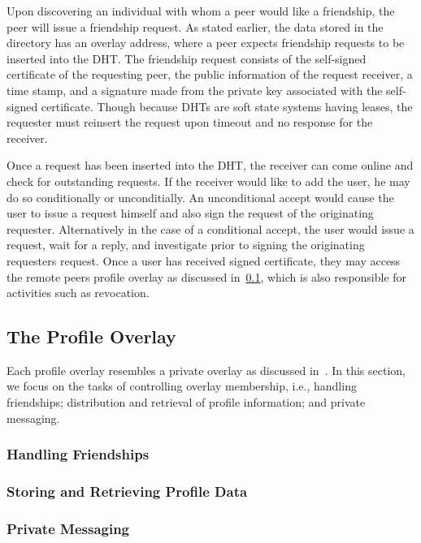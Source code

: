 \documentclass[letterpaper,twocolumn,10pt]{article}
\begin{document}
Upon discovering an individual with whom a peer would like a friendship, the
peer will issue a friendship request.  As stated earlier, the data stored in
the directory has an overlay address, where a peer expects friendship requests
to be inserted into the DHT.  The friendship request consists of the self-signed
certificate of the requesting peer, the public information of the request
receiver, a time stamp, and a signature made from the private key associated with
the self-signed certificate.  Though because DHTs are soft state systems having
leases, the requester must reinsert the request upon timeout and no response for
the receiver.

Once a request has been inserted into the DHT, the receiver can come online and
check for outstanding requests.  If the receiver would like to add the user, he
may do so conditionally or unconditially.  An unconditional accept would cause
the user to issue a request himself and also sign the request of the originating
requester.  Alternatively in the case of a conditional accept, the user would
issue a request, wait for a reply, and investigate prior to signing the originating
requesters request.  Once a user has received signed certificate, they may access
the remote peers profile overlay as discussed in~\ref{profile_overlay}, which is
also responsible for activities such as revocation.

\subsection{The Profile Overlay}
\label{profile_overlay}
Each profile overlay resembles a private overlay as discussed in~\cite{icdcs10}.
In this section, we focus on the tasks of controlling overlay membership, i.e.,
handling friendships; distribution and retrieval of profile information; and
private messaging.
\subsubsection{Handling Friendships}
\subsubsection{Storing and Retrieving Profile Data}
\subsubsection{Private Messaging}
\end{document}
